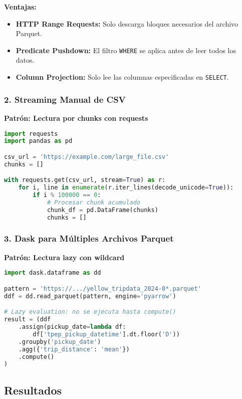 \documentclass[12pt]{src/formato_utem}
\begin{document}
\textbf{Ventajas:}
\begin{itemize}
    \item \textbf{HTTP Range Requests:} Solo descarga bloques necesarios del archivo Parquet.
    \item \textbf{Predicate Pushdown:} El filtro \texttt{WHERE} se aplica antes de leer todos los datos.
    \item \textbf{Column Projection:} Solo lee las columnas especificadas en \texttt{SELECT}.
\end{itemize}

\subsubsection{2. Streaming Manual de CSV}

\textbf{Patrón: Lectura por chunks con requests}

\begin{lstlisting}[language=Python]
import requests
import pandas as pd

csv_url = 'https://example.com/large_file.csv'
chunks = []

with requests.get(csv_url, stream=True) as r:
    for i, line in enumerate(r.iter_lines(decode_unicode=True)):
        if i % 100000 == 0:
            # Procesar chunk acumulado
            chunk_df = pd.DataFrame(chunks)
            chunks = []
\end{lstlisting}

\subsubsection{3. Dask para Múltiples Archivos Parquet}

\textbf{Patrón: Lectura lazy con wildcard}

\begin{lstlisting}[language=Python]
import dask.dataframe as dd

pattern = 'https://.../yellow_tripdata_2024-0*.parquet'
ddf = dd.read_parquet(pattern, engine='pyarrow')

# Lazy evaluation: no se ejecuta hasta compute()
result = (ddf
    .assign(pickup_date=lambda df: 
        df['tpep_pickup_datetime'].dt.floor('D'))
    .groupby('pickup_date')
    .agg({'trip_distance': 'mean'})
    .compute()
)
\end{lstlisting}

\subsection{Resultados}
\end{document}
